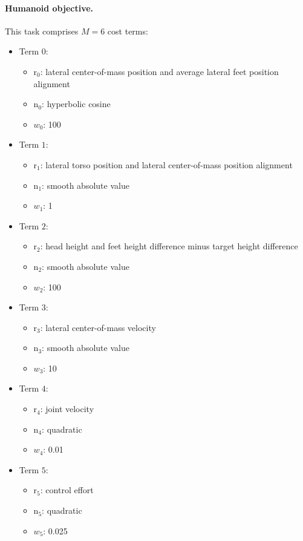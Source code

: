\paragraph{Humanoid objective.} \label{ps_obj_humanoid}
This task comprises $M = 6$ cost terms:
\begin{itemize}
	\item Term $0$:
	\begin{itemize}
		\item[] $\text{r}_0$: lateral center-of-mass position and average lateral feet position alignment 
		\item[] $\text{n}_0$: hyperbolic cosine
		\item[] $w_0$: 100
	\end{itemize}
	\item Term $1$:
	\begin{itemize}
		\item[] $\text{r}_1$: lateral torso position and lateral center-of-mass position alignment
		\item[] $\text{n}_1$: smooth absolute value
		\item[] $w_1$: 1
	\end{itemize}
	\item Term $2$:
	\begin{itemize}
		\item $\text{r}_2$: head height and feet height difference minus target height difference
		\item $\text{n}_2$: smooth absolute value
		\item $w_2$: 100
	\end{itemize}
	\item Term $3$:
	\begin{itemize}
		\item[] $\text{r}_3$: lateral center-of-mass velocity
		\item[] $\text{n}_3$: smooth absolute value
		\item[] $w_3$: 10
	\end{itemize}
	\item Term $4$:
	\begin{itemize}
		\item[] $\text{r}_4$: joint velocity
		\item[] $\text{n}_4$: quadratic
		\item[] $w_4$: 0.01
	\end{itemize}
	\item Term $5$:
	\begin{itemize}
		\item[] $\text{r}_5$: control effort
		\item[] $\text{n}_5$: quadratic
		\item[] $w_5$: 0.025
	\end{itemize}
\end{itemize}

